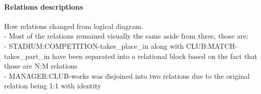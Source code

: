 \documentclass{report}
\begin{document}
\paragraph{Relations descriptions}
How relations changed from logical diagram.\\
- Most of the relations remained visually the same aside from three, those are:\\
- STADIUM:COMPETITION-takes\_place\_in along with CLUB:MATCH-takes\_part\_in have been separated into a relational block based on the fact that those are N:M relations\\
- MANAGER:CLUB-works was disjoined into two relations due to the original relation being 1:1 with identity
\end{document}
